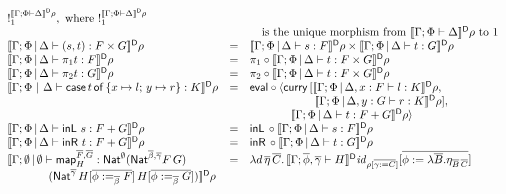 \documentclass[runningheads]{llncs}
\renewcommand{\id}{\mathit{id}}
\newcommand{\map}{\mathsf{map}}
\renewcommand{\id}{\mathit{id}}
\newcommand{\inl}{\mathsf{inL}\,}
\newcommand{\inr}{\mathsf{inR}\,}
\begin{document}
\begin{figure}[t]
\begin{adjustbox}{varwidth=6in, max width=5.3in, fbox, center}
\[\begin{array}{lll}
!^{\dsem{\Gamma;\Phi\vdash \Delta}\rho}_1, \mbox{ where }
!^{\dsem{\Gamma;\Phi\vdash \Delta}\rho}_1\\ 
& & \hspace*{0.1in} \mbox{ is the unique morphism from }
\dsem{\Gamma;\Phi\vdash \Delta}\rho \mbox{ to } 1\\ 
\dsem{\Gamma;\Phi \,|\, \Delta \vdash (s,t) : F \times G} \rho& = &
\dsem{\Gamma;\Phi \,|\, \Delta \vdash s: F} \rho\times
\dsem{\Gamma;\Phi \,|\, \Delta \vdash t : G} \rho\\
\dsem{\Gamma;\Phi \,|\, \Delta \vdash \pi_1 t : F} \rho& = &
\pi_1 \circ \dsem{\Gamma;\Phi \,|\, \Delta \vdash t : F \times G}\rho\\
\dsem{\Gamma;\Phi \,|\, \Delta \vdash \pi_2 t : G}\rho & = &
\pi_2 \circ \dsem{\Gamma;\Phi \,|\, \Delta \vdash t : F \times
  G} \rho\\
\dsem{\Gamma;\Phi~|~\Delta \vdash \cse{t}{x \mapsto l}{y \mapsto r} :
  K}\rho & = & \eval \circ \langle \curry \,[\dsem{\Gamma;\Phi
    \,|\, \Delta, x : F \vdash l : K}\rho,\\
   & & \hspace*{0.79in} \dsem{\Gamma;\Phi \,|\, \Delta, y
    : G \vdash r : K}\rho],\\
   & &  \hspace*{0.5in} \dsem{\Gamma;\Phi \,|\, \Delta \vdash t :
  F + G} \rho\rangle\\   
\dsem{\Gamma;\Phi \,|\, \Delta \vdash \inl \,s: F + G} \rho& = &
\inl \circ \dsem{\Gamma;\Phi \,|\, \Delta \vdash s: F}\rho\\
\dsem{\Gamma;\Phi \,|\, \Delta \vdash \inr \,t: F + G}\rho & = & 
\inr \circ \dsem{\Gamma;\Phi \,|\, \Delta \vdash t : G}\rho\\
\llbracket \Gamma;\emptyset \,|\, \emptyset \vdash \map^{\ol{F},\ol{G}}_H
  : \Nat^\emptyset (\Nat^{\ol\beta,\ol\gamma} F\,G)
& = & \lambda d\, \ol\eta\,\ol{C}.\,
\dsem{\Gamma; \ol{\phi},\ol{\gamma}\vdash H}\id_{\rho[\ol{\gamma:=
      C}]}[\ol{\phi := \lambda \ol B. \eta_{\ol B\, \ol C}}]\\ 
\hspace*{0.5in}
  (\Nat^{\ol{\gamma}}\,H[\ol{\phi :=_{\ol{\beta}} F}]\,H[\ol{\phi
      :=_{\ol{\beta}} G}]) \rrbracket^{\mathsf D} \rho & &\\

\end{array}\]
\end{adjustbox}
\end{figure}
\end{document}
